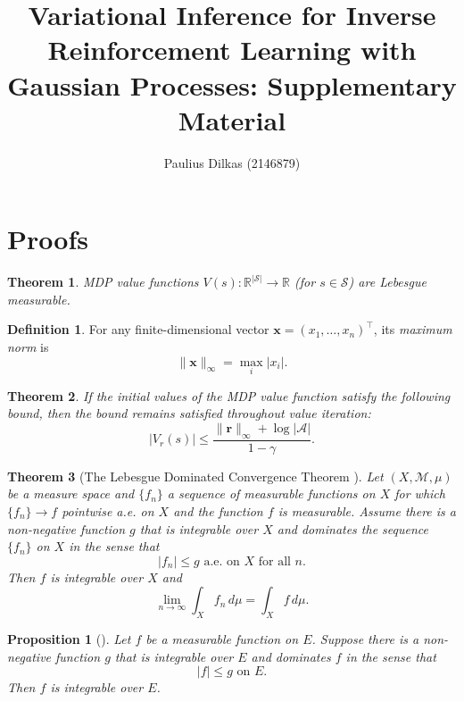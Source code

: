 \documentclass{article}
\title{Variational Inference for Inverse Reinforcement Learning with Gaussian
  Processes: Supplementary Material}
\author{Paulius Dilkas (2146879)}
\newtheorem{theorem}{Theorem}
\newtheorem{proposition}{Proposition}
\theoremstyle{definition}
\newtheorem{definition}{Definition}
\newcommand{\rinf}{\lVert \mathbf{r} \rVert_\infty}
\newcommand{\vbound}{\frac{\rinf + \log|\mathcal{A}|}{1 - \gamma}}
\begin{document}
\maketitle


\section{Proofs}

\begin{theorem} \label{thm:measurability}
  MDP value functions $V(s) : \mathbb{R}^{|\mathcal{S}|} \to \mathbb{R}$ (for $s
  \in \mathcal{S}$) are Lebesgue measurable.
\end{theorem}

\begin{definition}
  For any finite-dimensional vector $\mathbf{x} = (x_1, \dots, x_n)^\intercal$,
  its \emph{maximum norm} is
  \[ \lVert \mathbf{x} \rVert_\infty = \max_i |x_i|. \]
\end{definition}

\begin{theorem} \label{thm:bound}
  If the initial values of the MDP value function satisfy the following
  bound, then the bound remains satisfied throughout value iteration:
  \[ |V_r(s)| \le \vbound. \]
\end{theorem}

\begin{theorem}[The Lebesgue Dominated Convergence Theorem
  \cite{royden2010real}] \label{thm:lebesgue}
  Let $(X, \mathcal{M}, \mu)$ be a measure space and $\{ f_n \}$ a sequence of
  measurable functions on $X$ for which $\{ f_n \} \to f$ pointwise a.e. on $X$
  and the function $f$ is measurable. Assume there is a non-negative function
  $g$ that is integrable over $X$ and dominates the sequence $\{ f_n \}$ on $X$
  in the sense that
  \[ |f_n| \le g \text{ a.e. on $X$ for all $n$.} \]
  Then $f$ is integrable over $X$ and
  \[ \lim_{n \to \infty} \int_X f_n\,d\mu = \int_X f\,d\mu. \]
\end{theorem}


\begin{proposition}[\cite{royden2010real}]
  Let $f$ be a measurable function on $E$. Suppose there is a non-negative
  function $g$ that is integrable over $E$ and dominates $f$ in the sense that
  \[ |f| \le g \text{ on } E. \]
  Then $f$ is integrable over $E$.
\end{proposition}
\end{document}

